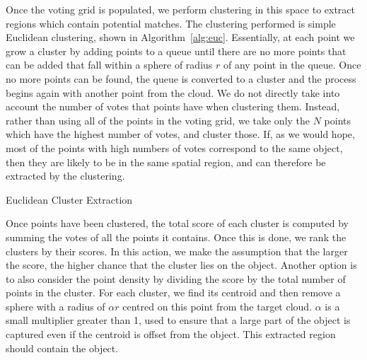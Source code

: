 \documentclass[11pt,a4paper]{kth-mag}
\begin{document}
Once the voting grid is populated, we perform clustering in this space to
extract regions which contain potential matches. The clustering performed is
simple Euclidean clustering, shown in Algorithm~\ref{alg:euc}. Essentially, at
each point we grow a cluster by adding points to a queue until there are no more
points that can be added that fall within a sphere of radius $r$ of any point in
the queue. Once no more points can be found, the queue is converted to a cluster
and the process begins again with another point from the cloud. We do not
directly take into account the number of votes that points have when clustering
them. Instead, rather than using all of the points in the voting grid, we take
only the $N$ points which have the highest number of votes, and cluster those.
If, as we would hope, most of the points with high numbers of votes correspond
to the same object, then they are likely to be in the same spatial region, and
can therefore be extracted by the clustering.

\begin{algorithm}
  \DontPrintSemicolon
  \caption{Euclidean Cluster Extraction \cite{RusuDoctoralDissertation}}
  \label{alg:euc}
\end{algorithm}

Once points have been clustered, the total score of each cluster is computed by
summing the votes of all the points it contains. Once this is done, we rank the
clusters by their scores. In this action, we make the assumption that the larger
the score, the higher chance that the cluster lies on the object. Another option
is to also consider the point density by dividing the score by the total number
of points in the cluster. For each cluster, we find its centroid and then remove
a sphere with a radius of $\alpha r$ centred on this point from the target
cloud. $\alpha$ is a small multiplier greater than 1, used to ensure that a
large part of the object is captured even if the centroid is offset from the
object. This extracted region should contain the object.
\end{document}
